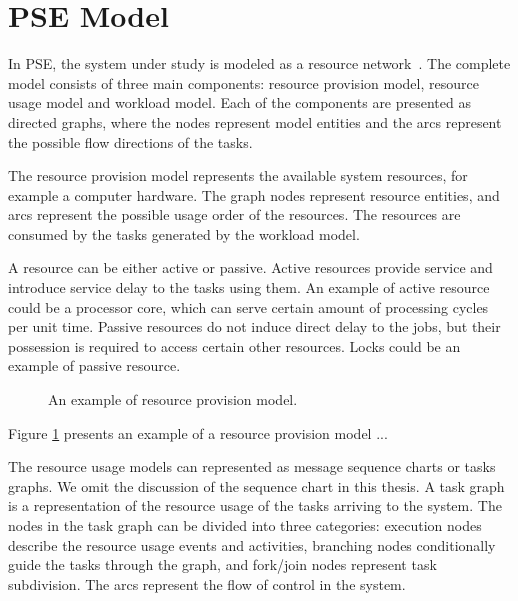 
\section{PSE Model}

In PSE, the system under study is modeled as a resource network~\cite{Menasce:1994:CPP:174466}. The complete model consists of three main components: resource provision model, resource usage model and workload model. Each of the components are presented as directed graphs, where the nodes represent model entities and the arcs represent the possible flow directions of the tasks.

The resource provision model represents the available system resources, for example a computer hardware. The graph nodes represent resource entities, and arcs represent the possible usage order of the resources. The resources are consumed by the tasks generated by the workload model.

A resource can be either active or passive. Active resources provide service and introduce service delay to the tasks using them. An example of active resource could be a processor core, which can serve certain amount of processing cycles per unit time. Passive resources do not induce direct delay to the jobs, but their possession is required to access certain other resources. Locks  could be an example of passive resource.

\begin{figure}[h!]
  \begin{center}
    \caption{An example of resource provision model.}
    \label{fig:resource-provision-model}
  \end{center}

\end{figure}

Figure \ref{fig:resource-provision-model} presents an example of a resource provision model ...

The resource usage models can represented as message sequence charts or tasks graphs. We omit the discussion of the sequence chart in this thesis. A task graph is a representation of the resource usage of the tasks arriving to the system. The nodes in the task graph can be divided into three categories: execution nodes describe the resource usage events and activities, branching nodes conditionally guide the tasks through the graph, and fork/join nodes represent task subdivision. The arcs represent the flow of control in the system.

